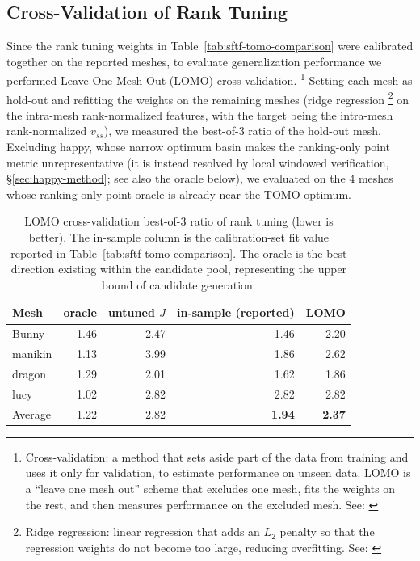 \documentclass[11pt,a4paper]{article}
\begin{document}
\subsection{Cross-Validation of Rank Tuning}
\label{sec:cv}

Since the rank tuning weights in Table~\ref{tab:sftf-tomo-comparison} were calibrated together on the reported meshes,
to evaluate generalization performance we performed Leave-One-Mesh-Out (LOMO) cross-validation.%
\footnote{Cross-validation: a method that sets aside part of the data from training and uses it only for validation, to estimate performance
on unseen data. LOMO is a ``leave one mesh out'' scheme that excludes one mesh, fits the weights on the rest, and then measures performance
on the excluded mesh. See: \cite{stone1974}}
Setting each mesh as hold-out and refitting the weights on the remaining meshes
(ridge regression%
\footnote{Ridge regression: linear regression that adds an $L_2$ penalty so that the regression weights do not become too large,
reducing overfitting. See: \cite{hoerl1970}} on the intra-mesh rank-normalized features, with the target being the intra-mesh rank-normalized $v_{ss}$),
we measured the best-of-3 ratio of the hold-out mesh.
Excluding happy, whose narrow optimum basin makes the ranking-only point metric unrepresentative (it is instead
resolved by local windowed verification, \S\ref{sec:happy-method}; see also the oracle below),
we evaluated on the 4 meshes whose ranking-only point oracle is already near the TOMO optimum.

\begin{table}[H]
\centering
\caption{LOMO cross-validation best-of-3 ratio of rank tuning (lower is better).
The in-sample column is the calibration-set fit value reported in Table~\ref{tab:sftf-tomo-comparison}.
The oracle is the best direction existing within the candidate pool, representing the upper bound of candidate generation.}
\label{tab:lomo-cv}
\begin{tabular}{lrrrr}
\toprule
Mesh & oracle & untuned $J$ & in-sample (reported) & LOMO\\
\midrule
Bunny    & 1.46 & 2.47 & 1.46 & 2.20\\
manikin  & 1.13 & 3.99 & 1.86 & 2.62\\
dragon   & 1.29 & 2.01 & 1.62 & 1.86\\
lucy     & 1.02 & 2.82 & 2.82 & 2.82\\
\midrule
Average     & 1.22 & 2.82 & \textbf{1.94} & \textbf{2.37}\\
\bottomrule
\end{tabular}
\end{table}
\end{document}
